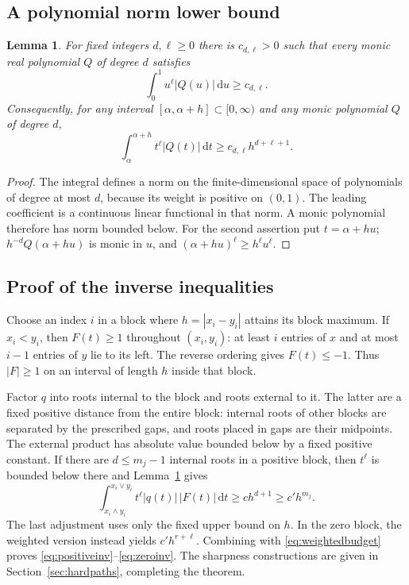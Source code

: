 \documentclass[11pt,a4paper]{article}
\numberwithin{equation}{section}
\newtheorem{lemma}[theorem]{Lemma}
\theoremstyle{definition}
\theoremstyle{remark}
\newcommand{\dd}{\,\mathrm d}
\begin{document}
\subsection{A polynomial norm lower bound}
\begin{lemma}
\label{lem:polynorm}
For fixed integers $d,\ell\ge0$ there is $c_{d,\ell}>0$ such that every monic
real polynomial $Q$ of degree $d$ satisfies
\begin{equation}
 \int_0^1 u^\ell|Q(u)|\dd u\ge c_{d,\ell}.
\end{equation}
Consequently, for any interval $[\alpha,\alpha+h]\subset[0,\infty)$ and any
monic polynomial $Q$ of degree $d$,
\begin{equation}
 \int_\alpha^{\alpha+h}t^\ell|Q(t)|\dd t\ge c_{d,\ell}h^{d+\ell+1}.
 \label{eq:scalednorm}
\end{equation}
\end{lemma}
\begin{proof}
The integral defines a norm on the finite-dimensional space of polynomials
of degree at most $d$, because its weight is positive on $(0,1)$. The leading
coefficient is a continuous linear functional in that norm. A monic
polynomial therefore has norm bounded below. For the second assertion put
$t=\alpha+hu$; $h^{-d}Q(\alpha+hu)$ is monic in $u$, and
$(\alpha+hu)^\ell\ge h^\ell u^\ell$.
\end{proof}

\subsection{Proof of the inverse inequalities}
Choose an index $i$ in a block where $h=|x_i-y_i|$ attains its block maximum.
If $x_i<y_i$, then $F(t)\ge1$ throughout $(x_i,y_i)$: at least $i$ entries
of $x$ and at most $i-1$ entries of $y$ lie to its left. The reverse ordering
gives $F(t)\le-1$. Thus $|F|\ge1$ on an interval of length $h$ inside that
block.

Factor $q$ into roots internal to the block and roots external to it.
The latter are a fixed positive distance from the entire block: internal
roots of other blocks are separated by the prescribed gaps, and roots placed
in gaps are their midpoints. The external product has absolute value bounded
below by a fixed positive constant. If there are $d\le m_j-1$ internal
roots in a positive block, then $t^\ell$ is bounded below there and
Lemma~\ref{lem:polynorm} gives
\begin{equation}
 \int_{x_i\wedge y_i}^{x_i\vee y_i}
 t^\ell|q(t)|\,|F(t)|\dd t\ge c h^{d+1}\ge c' h^{m_j}.
\end{equation}
The last adjustment uses only the fixed upper bound on $h$. In the zero
block, the weighted version instead yields $c'h^{r+\ell}$.
Combining with \eqref{eq:weightedbudget} proves
\eqref{eq:positiveinv}--\eqref{eq:zeroinv}. The sharpness constructions are
given in Section~\ref{sec:hardpaths}, completing the theorem.
\end{document}
